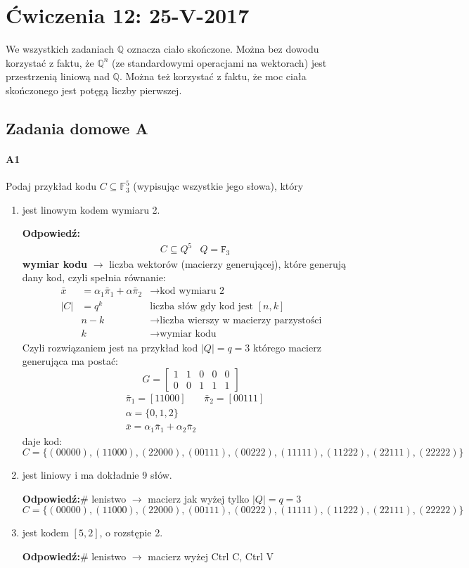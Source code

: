 \section{Ćwiczenia 12: 25-V-2017}
We wszystkich zadaniach $\mathbb{Q}$ oznacza ciało skończone. Można bez dowodu korzystać z faktu, że $\mathbb{Q}^n$ (ze standardowymi operacjami na wektorach) jest przestrzenią liniową nad $\mathbb{Q}$. Można też korzystać z faktu, że moc ciała skończonego jest potęgą liczby pierwszej.

\subsection{Zadania domowe A}
\paragraph{A1} Podaj przykład kodu $C\subseteq \mathbb{F}^5_3$ (wypisując wszystkie jego słowa), który
\begin{enumerate}[label=\alph*)]
\item jest linowym kodem wymiaru 2.

\textbf{Odpowiedź:}
\begin{align*}
&C\subseteq Q^5& Q=\mathtt{F}_3
\end{align*}
\textbf{wymiar kodu} $\rightarrow$ liczba wektorów (macierzy generującej), które generują dany kod, czyli spełnia równanie:
\begin{align*}
\bar{x}&= \alpha _1\bar{\pi}_1 + \alpha\bar{\pi}_2 &\rightarrow\text{kod wymiaru 2}\\
|C|&=q^k &\text{liczba słów gdy kod jest }[n,k]\\
&n-k&\rightarrow\text{liczba wierszy w macierzy parzystości}\\
&k&\rightarrow\text{wymiar kodu}
\end{align*}
Czyli rozwiązaniem jest na przykład kod $|Q|=q=3$ którego macierz generująca ma postać:
$$G=\begin{bmatrix}
1&1&0&0&0\\0&0&1&1&1
\end{bmatrix}$$ 
\begin{align*}
&\bar{\pi}_1=[11000] &\bar{\pi}_2=[00111]\\
&\alpha =\{0,1,2\}\\
&\bar{x}=\alpha_1\bar{\pi}_1+\alpha_2\bar{\pi}_2
\end{align*}
daje kod:
$$C=\{(00000),(11000),(22000),(00111),(00222),(11111),(11222),(22111),(22222)\}$$
\item jest liniowy i ma dokładnie 9 słów.

\textbf{Odpowiedź:}\# lenistwo $\rightarrow$ macierz jak wyżej tylko $|Q|=q=3$
$$C=\{(00000),(11000),(22000),(00111),(00222),(11111),(11222),(22111),(22222)\}$$
\item jest kodem $[5, 2]$, o rozstępie 2.

\textbf{Odpowiedź:}\# lenistwo $\rightarrow$ macierz wyżej Ctrl C, Ctrl V
\end{enumerate}

